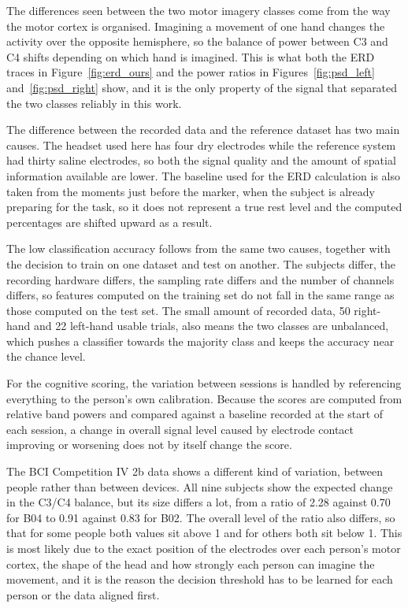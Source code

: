 The differences seen between the two motor imagery classes come from the way the motor
cortex is organised. Imagining a movement of one hand changes the activity over the
opposite hemisphere, so the balance of power between C3 and C4 shifts depending on which
hand is imagined. This is what both the ERD traces in Figure~\ref{fig:erd_ours} and the
power ratios in Figures~\ref{fig:psd_left} and~\ref{fig:psd_right} show, and it is the only
property of the signal that separated the two classes reliably in this work.

The difference between the recorded data and the reference dataset has two main causes. The
headset used here has four dry electrodes while the reference system had thirty saline
electrodes, so both the signal quality and the amount of spatial information available are
lower. The baseline used for the ERD calculation is also taken from the moments just before
the marker, when the subject is already preparing for the task, so it does not represent a
true rest level and the computed percentages are shifted upward as a result.

The low classification accuracy follows from the same two causes, together with the decision
to train on one dataset and test on another. The subjects differ, the recording hardware
differs, the sampling rate differs and the number of channels differs, so features computed
on the training set do not fall in the same range as those computed on the test set. The
small amount of recorded data, 50 right-hand and 22 left-hand usable trials, also means the
two classes are unbalanced, which pushes a classifier towards the majority class and keeps
the accuracy near the chance level.

For the cognitive scoring, the variation between sessions is handled by referencing
everything to the person's own calibration. Because the scores are computed from relative
band powers and compared against a baseline recorded at the start of each session, a change
in overall signal level caused by electrode contact improving or worsening does not by
itself change the score.

The BCI Competition IV 2b data shows a different kind of variation, between people
rather than between devices. All nine subjects show the expected change in the C3/C4
balance, but its size differs a lot, from a ratio of 2.28 against 0.70 for B04 to 0.91
against 0.83 for B02. The overall level of the ratio also differs, so that for some
people both values sit above 1 and for others both sit below 1. This is most likely due
to the exact
position of the electrodes over each person's motor cortex, the shape of the head and how
strongly each person can imagine the movement, and it is the reason the decision threshold has to
be learned for each person or the data aligned first.

